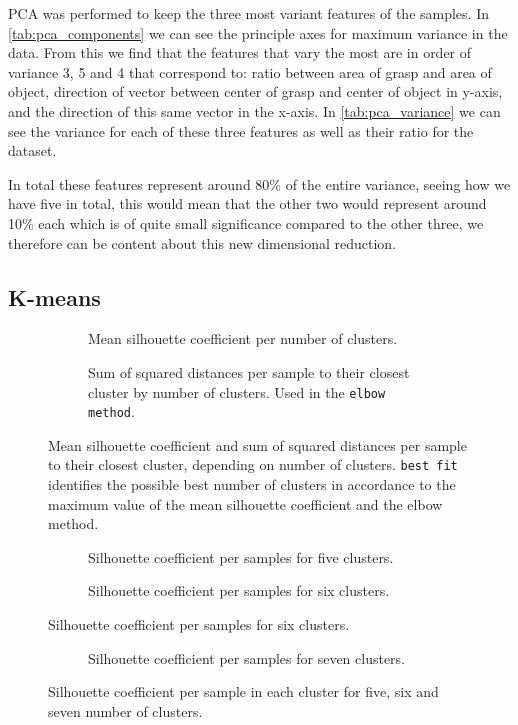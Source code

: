 PCA was performed to keep the three most variant features of the samples. In \ref{tab:pca_components} we can see the principle axes for maximum variance in the data. From this we find that the features that vary the most are in order of variance 3, 5 and 4 that correspond to: ratio between area of grasp and area of object, direction of vector between center of grasp and center of object in y-axis, and the direction of this same vector in the x-axis. In \ref{tab:pca_variance} we can see the variance for each of these three features as well as their ratio for the dataset.

In total these features represent around 80\% of the entire variance, seeing how we have five in total, this would mean that the other two would represent around 10\% each which is of quite small significance compared to the other three, we therefore can be content about this new dimensional reduction.


\subsection{K-means}

\begin{figure}
	\begin{subfigure}[b]{\textwidth}
		
		\caption{Mean silhouette coefficient per number of clusters.}
	\end{subfigure}
	\begin{subfigure}[b]{\textwidth}
		
		\caption{Sum of squared distances per sample to their closest cluster by number of clusters. Used in the \texttt{elbow method}.}
	\end{subfigure}
	\caption{Mean silhouette coefficient and sum of squared distances per sample to their closest cluster, depending on number of clusters. \texttt{best fit} identifies the possible best number of clusters in accordance to the maximum value of the mean silhouette coefficient and the elbow method.}
	\label{fig:kmeans_score}
\end{figure}

\begin{figure}
	\begin{subfigure}[b]{\textwidth}
		
		\caption{Silhouette coefficient per samples for five clusters.}
	\end{subfigure}
	\begin{subfigure}[b]{\textwidth}
		
		\caption{Silhouette coefficient per samples for six clusters.}
		\label{fig:silhouette_6}
	\end{subfigure}
\end{figure}
\begin{figure}
	\ContinuedFloat
	\begin{subfigure}[b]{\textwidth}
		
		\caption{Silhouette coefficient per samples for seven clusters.}
	\end{subfigure}
	\caption{Silhouette coefficient per sample in each cluster for five, six and seven number of clusters.}
	\label{fig:silhouette_coef}
\end{figure}

